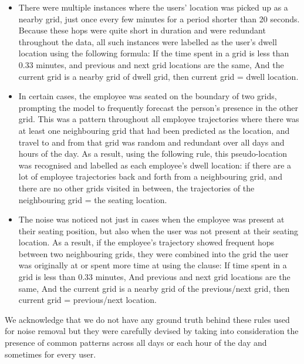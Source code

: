 \documentclass[acmtog]{acmart}
\begin{document}
\begin{itemize}
    \item There were multiple instances where the users' location was picked up as a nearby grid, just once every few minutes for a period shorter than 20 seconds. Because these hops were quite short in duration and were redundant throughout the data, all such instances were labelled as the user's dwell location using the following formula: 
    If the time spent in a grid is less than 0.33 minutes, 
    and previous and next grid locations are the same,
    And the current grid is a nearby grid of dwell grid, 
    then current grid = dwell location.	
    \item In certain cases, the employee was seated on the boundary of two grids, prompting the model to frequently forecast the person's presence in the other grid. This was a pattern throughout all employee trajectories where there was at least one neighbouring grid that had been predicted as the location, and travel to and from that grid was random and redundant over all days and hours of the day. As a result, using the following rule, this pseudo-location was recognised and labelled as each employee's dwell location:
    if there are a lot of employee trajectories back and forth from a neighbouring grid, 
    and there are no other grids visited in between, 
    the trajectories of the neighbouring grid = the seating location.    
    \item The noise was noticed not just in cases when the employee was present at their seating position, but also when the user was not present at their seating location. As a result, if the employee's trajectory showed frequent hops between two neighbouring grids, they were combined into the grid the user was originally at or spent more time at using the clause: 
    If time spent in a grid is less than 0.33 minutes,
    And previous and next grid locations are the same,
    And the current grid is a nearby grid of the previous/next grid,
    then current grid = previous/next location.
\end{itemize}


We acknowledge that we do not have any ground truth behind these rules used for noise removal but they were carefully devised by taking into consideration the presence of common patterns across all days or each hour of the day and sometimes for every user.


\end{document}
